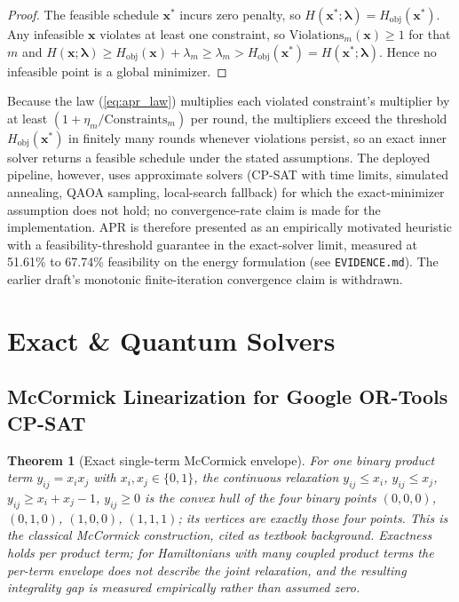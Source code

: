 \documentclass[journal]{IEEEtran}
\newtheorem{theorem}{Theorem}
\theoremstyle{definition}
\begin{document}
\begin{proof}
The feasible schedule $\mathbf{x}^*$ incurs zero penalty, so $H(\mathbf{x}^*; \boldsymbol{\lambda}) = H_{\text{obj}}(\mathbf{x}^*)$. Any infeasible $\mathbf{x}$ violates at least one constraint, so $\text{Violations}_m(\mathbf{x}) \ge 1$ for that $m$ and $H(\mathbf{x}; \boldsymbol{\lambda}) \ge H_{\text{obj}}(\mathbf{x}) + \lambda_m \ge \lambda_m > H_{\text{obj}}(\mathbf{x}^*) = H(\mathbf{x}^*; \boldsymbol{\lambda})$. Hence no infeasible point is a global minimizer.
\end{proof}

Because the law (\ref{eq:apr_law}) multiplies each violated constraint's multiplier by at least $(1 + \eta_m / \text{Constraints}_m)$ per round, the multipliers exceed the threshold $H_{\text{obj}}(\mathbf{x}^*)$ in finitely many rounds whenever violations persist, so an exact inner solver returns a feasible schedule under the stated assumptions. The deployed pipeline, however, uses approximate solvers (CP-SAT with time limits, simulated annealing, QAOA sampling, local-search fallback) for which the exact-minimizer assumption does not hold; no convergence-rate claim is made for the implementation. APR is therefore presented as an empirically motivated heuristic with a feasibility-threshold guarantee in the exact-solver limit, measured at 51.61\% to 67.74\% feasibility on the energy formulation (see \texttt{EVIDENCE.md}). The earlier draft's monotonic finite-iteration convergence claim is withdrawn.

\section{Exact \& Quantum Solvers}
\subsection{McCormick Linearization for Google OR-Tools CP-SAT}
\begin{theorem}[Exact single-term McCormick envelope]
For one binary product term $y_{ij} = x_i x_j$ with $x_i, x_j \in \{0, 1\}$, the continuous relaxation $y_{ij} \le x_i$, $y_{ij} \le x_j$, $y_{ij} \ge x_i + x_j - 1$, $y_{ij} \ge 0$ is the convex hull of the four binary points $(0,0,0)$, $(0,1,0)$, $(1,0,0)$, $(1,1,1)$; its vertices are exactly those four points. This is the classical McCormick construction, cited as textbook background. Exactness holds per product term; for Hamiltonians with many coupled product terms the per-term envelope does not describe the joint relaxation, and the resulting integrality gap is measured empirically rather than assumed zero.
\end{theorem}
\end{document}
